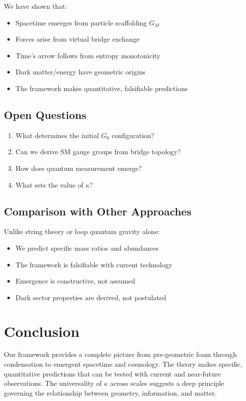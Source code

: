 \documentclass[11pt]{article}
\theoremstyle{plain}
\theoremstyle{definition}
\begin{document}
We have shown that:
\begin{itemize}
  \item Spacetime emerges from particle scaffolding $G_M$
  \item Forces arise from virtual bridge exchange
  \item Time's arrow follows from entropy monotonicity
  \item Dark matter/energy have geometric origins
  \item The framework makes quantitative, falsifiable predictions
\end{itemize}

\subsection{Open Questions}

\begin{enumerate}
  \item What determines the initial $G_0$ configuration?
  \item Can we derive SM gauge groups from bridge topology?
  \item How does quantum measurement emerge?
  \item What sets the value of $\kappa$?
\end{enumerate}

\subsection{Comparison with Other Approaches}

Unlike string theory or loop quantum gravity alone:
\begin{itemize}
  \item We predict specific mass ratios and abundances
  \item The framework is falsifiable with current technology
  \item Emergence is constructive, not assumed
  \item Dark sector properties are derived, not postulated
\end{itemize}

\section{Conclusion}

Our framework provides a complete picture from pre-geometric foam through condensation to emergent spacetime and cosmology. The theory makes specific, quantitative predictions that can be tested with current and near-future observations. The universality of $\kappa$ across scales suggests a deep principle governing the relationship between geometry, information, and matter.
\end{document}
